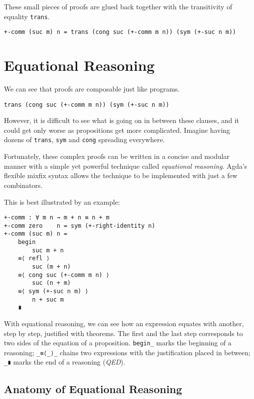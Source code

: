 \documentclass[../thesis.tex]{subfiles}
\begin{document}
These small pieces of proofs are glued back together with the transitivity of
equality {\lstinline|trans|}.

\begin{lstlisting}
+-comm (suc m) n = trans (cong suc (+-comm m n)) (sym (+-suc n m))
\end{lstlisting}

\section{Equational Reasoning}

We can see that proofs are composable just like programs.

\begin{lstlisting}
trans (cong suc (+-comm m n)) (sym (+-suc n m))
\end{lstlisting}

However, it is difficult to see what is going on in between these clauses, and it could
get only worse as propositions get more complicated.
Imagine having dozens of {\lstinline|trans|}, {\lstinline|sym|} and {\lstinline|cong|}
spreading everywhere.

Fortunately, these complex proofs can be written in a concise and modular manner
with a simple yet powerful technique called \textit{equational reasoning}.
Agda's flexible mixfix syntax allows the technique to be implemented with just
a few combinators\cite{erikhesselinkpaulvisschers2008}.

This is best illustrated by an example:

\begin{lstlisting}
+-comm : ∀ m n → m + n ≡ n + m
+-comm zero    n = sym (+-right-identity n)
+-comm (suc m) n =
    begin
        suc m + n
    ≡⟨ refl ⟩
        suc (m + n)
    ≡⟨ cong suc (+-comm m n) ⟩
        suc (n + m)
    ≡⟨ sym (+-suc n m) ⟩
        n + suc m
    ∎
\end{lstlisting}

With equational reasoning, we can see how an expression equates with another,
step by step, justified with theorems. The first and the last step corresponds to
two sides of the equation of a proposition. {\lstinline|begin_|} marks the beginning
of a reasoning; {\lstinline|_≡⟨_⟩_|} chains two expressions with the justification
placed in between; {\lstinline|_∎|} marks the end of a reasoning (\textit{QED}).

\subsection{Anatomy of Equational Reasoning}
\end{document}
